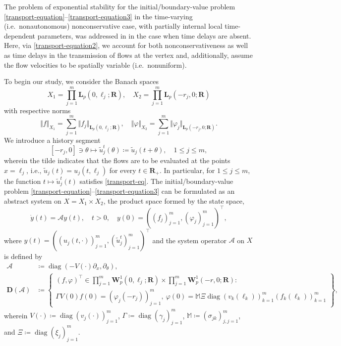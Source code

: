 \documentclass[a4paper,11pt,reqno]{amsart}
\def\calA{{\mathcal{A}}}
\def\R{\mathbf{R}}
\theoremstyle{plain}
\numberwithin{equation}{section}
\begin{document}
The problem of exponential stability for the initial/boundary-value problem \eqref{transport-equation}--\eqref{transport-equation3} in the time-varying (i.e.\ nonautonomous) nonconservative case, with partially internal local time-dependent parameters, was addressed in \cite{MR3624395} in the case when time delays are absent. Here, via \eqref{transport-equation2}, we account for both nonconservativeness as well as time delays in the transmission of flows at the vertex and, additionally, assume the flow velocities to be spatially variable (i.e.\ nonuniform).

To begin our study, we consider the Banach spaces
\begin{equation*}
X_1=\prod_{j=1}^m {\bm L}_p(0,\ell_j;\R),\quad X_2=\prod_{j=1}^m {\bm L}_p(-r_j,0;\R)
\end{equation*}
with respective norms
\begin{equation*}
\Vert f\Vert_{X_1}=\sum_{j=1}^{m}\Vert f_j\Vert_{{\bm L}_p(0,\ell_j;\R)},\quad \Vert \varphi\Vert_{X_2}=\sum_{j=1}^{m}\Vert \varphi_j\Vert_{{\bm L}_p(-r_j,0;\R)}.
\end{equation*}
We introduce a history segment
\begin{equation*}\label{segment1}
[-r_j,0]\ni \theta\mapsto \tilde{u}_j^t(\theta)\coloneqq \tilde{u}_j(t+\theta), \quad 1\le j\le m,
\end{equation*}
wherein the tilde indicates that the flows are to be evaluated at the points $x=\ell_j$, i.e., $\tilde{u}_j(t)=u_j(t,\ell_j)$ for every $t\in\R_+$. In particular, for $1\le j\le m$, the function $t\mapsto\tilde{u}_j^t(t)$ satisfies \eqref{transport-eq}. The initial/boundary-value problem \eqref{transport-equation}--\eqref{transport-equation3} can be formulated as an abstract system on $X=X_1\times X_2$, the product space formed by the state space,
\begin{equation*}
\dot{y}(t)=\calA y(t),\quad t> 0,\quad y(0)=((f_j)_{j=1}^m, (\varphi_j)_{j=1}^m)^\top,
\end{equation*} 
where $y(t)=((u_j(t,\cdot))_{j=1}^m,(\tilde{u}_j^t)_{j=1}^m)^\top$ and the system operator $\calA$ on $X$ is defined by 
\begin{equation}\label{cauchy-pb-ope}
\begin{split}
\calA &\coloneqq \operatorname{diag}(- V(\cdot)\partial_x, \partial_\theta),\\
{\bm D}(\calA) & \coloneqq \left\{\begin{gathered}(f,\varphi)^\top\in \prod_{j=1}^m {\bm W}_p^1(0,\ell_j;\R)\times \prod_{j=1}^m {\bm W}_p^1(-r,0;\R):\\ \Gamma V(0)f(0)=(\varphi_j(-r_j))_{j=1}^m,~
\varphi(0)=\mathbb{M}\Xi \operatorname{diag}(v_k(\ell_{k}))_{k=1}^m (f_k(\ell_k))_{k=1}^m 
\end{gathered}\right\}, 
\end{split}
\end{equation}
wherein $V(\cdot)\coloneqq \operatorname{diag}(v_j(\cdot))_{j=1}^m$, $\Gamma\coloneqq \operatorname{diag}(\gamma_j)_{j=1}^m$, $\mathbb{M}\coloneqq (\sigma_{jk})_{j,j=1}^m$, and $\Xi\coloneqq \operatorname{diag}(\xi_j)_{j=1}^m$.
\end{document}
